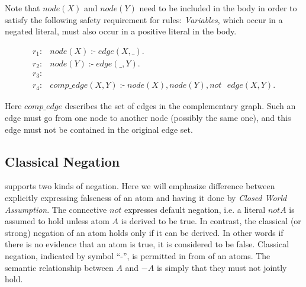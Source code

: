 \documentclass[14pt,a4paper, titlepage]{article}
\DeclareMathOperator{\leftimpl}{:-}
\begin{document}
Note that $\mathit{node}(X)$ and $\mathit{node}(Y)$ need to be included in the body in order to satisfy the following safety requirement for rules: \emph{Variables}, which occur in a negated literal, must also occur in a positive literal in the body.
\begin{exmp}
\begin{align*}
r_1\colon& \mathit{node}(X) \leftimpl \mathit{edge}(X, \_).\\
r_2\colon& \mathit{node}(Y) \leftimpl \mathit{edge}(\_, Y). \\
r_3\colon& \\
r_4\colon& \mathit{comp\_edge}(X, Y) \leftimpl \mathit{node}(X), \mathit{node}(Y), \mathit{not} \text{ } \mathit{edge}(X, Y). 
\end{align*}
\end{exmp}
Here $\mathit{comp\_edge}$ describes the set of edges in the complementary graph. Such an edge must go from one node to another node (possibly the same one), and this edge must not be contained in the original edge set. 

\subsection{Classical Negation}
\dlvhex{} supports two kinds of negation. Here we will emphasize difference between explicitly expressing falseness of an atom and having it done by \emph{Closed World Assumption}. The connective $\mathit{not}$ expresses default negation, i.e. a literal $\mathit{not}$\text{ }$A$ is assumed to hold unless atom $A$ is derived to be true. In contrast, the classical (or strong) negation of an atom holds only if it can be derived. In other words if there is no evidence that an atom is true, it is considered to be false. Classical negation, indicated by symbol \enquote{-}, is permitted in from of an atoms. The semantic relationship between $A$ and $-A$ is simply that they must not jointly hold.
\end{document}
